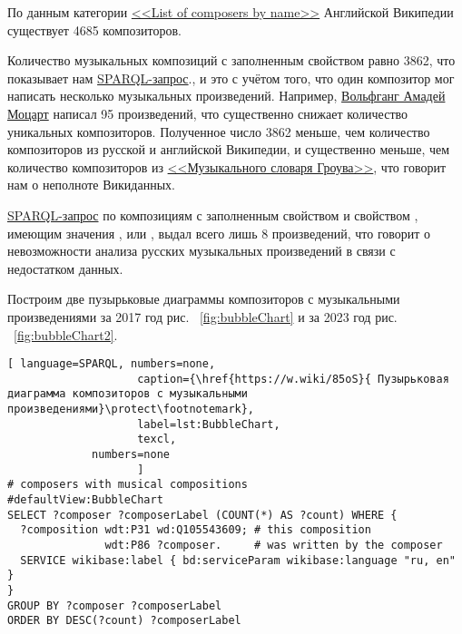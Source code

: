 По данным категории \href{https://en.wikipedia.org/wiki/List_of_composers_by_name}{<<List of composers by name>>} Английской Википедии существует \num{4685} композиторов.


Количество музыкальных композиций с заполненным свойством  равно \num{3862}, {что показывает нам \href{https://w.wiki/56Rc}{SPARQL-запрос}.}, и это с учётом того, что один композитор мог написать несколько музыкальных произведений. Например, \href{https://ru.wikipedia.org/wiki/Моцарт,_Вольфганг_Амадей}{Вольфганг Амадей Моцарт} написал \num{95} произведений, что существенно снижает количество уникальных композиторов. Полученное число \num{3862} меньше, чем количество композиторов из русской и английской Википедии, и существенно меньше, чем количество композиторов из \href{https://ru.wikipedia.org/wiki/Музыкальный_словарь_Гроува}{<<Музыкального словаря Гроува>>}, что говорит нам о неполноте Викиданных.

\href{https://w.wiki/56Rj}{SPARQL-запрос} по композициям с заполненным свойством  и свойством , имеющим значения ,  или , выдал всего лишь \num{8} произведений, что говорит о невозможности анализа русских музыкальных произведений в связи с недостатком данных.

Построим  две пузырьковые диаграммы композиторов с музыкальными произведениями за 2017 год рис. ~\ref{fig:bubbleChart} и за 2023 год рис. ~\ref{fig:bubbleChart2}.

\begin{lstlisting}[ language=SPARQL, numbers=none,
                    caption={\href{https://w.wiki/85oS}{ Пузырьковая диаграмма композиторов с музыкальными произведениями}\protect\footnotemark},
                    label=lst:BubbleChart,
                    texcl,
	         numbers=none
                    ]
# composers with musical compositions
#defaultView:BubbleChart
SELECT ?composer ?composerLabel (COUNT(*) AS ?count) WHERE {
  ?composition wdt:P31 wd:Q105543609; # this composition
               wdt:P86 ?composer.     # was written by the composer
  SERVICE wikibase:label { bd:serviceParam wikibase:language "ru, en" }
}
GROUP BY ?composer ?composerLabel
ORDER BY DESC(?count) ?composerLabel
\end{lstlisting}%

